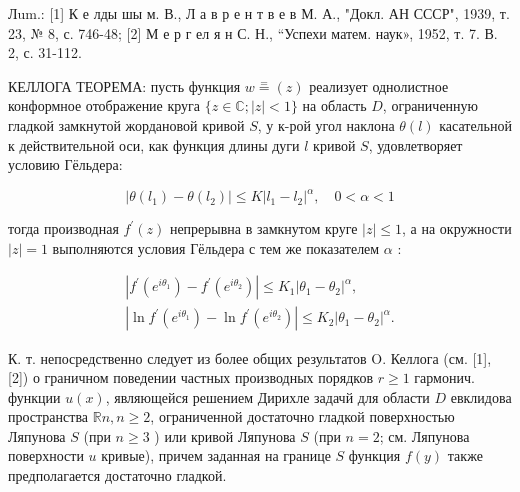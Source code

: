 \documentclass[10pt]{article}
\begin{document}
Лum.: [1] К е лды шы м. В., Л а в р е н т в е в М. А., "Докл. АН СССР", 1939, т. 23, № 8, с. 746-48; [2] М е р г ел я н С. Н., “Успехи матем. наук», 1952, т. 7. В. 2, с. 31-112.



КЕЛЛОГА ТЕОРЕМА: пусть функция $w \stackrel{=}{=}(z)$ реализует однолистное конформное отображение круга $\{z \in \mathbb{C} ;|z|<1\}$ на область $D$, ограниченную гладкой замкнутой жордановой кривой $S$, у к-рой угол наклона $\theta(l)$ касательной к действительной оси, как функция длины дуги $l$ кривой $S$, удовлетворяет условию Гёльдера:



\[

\left|\theta\left(l_{1}\right)-\theta\left(l_{2}\right)\right| \leqslant K\left|l_{1}-l_{2}\right|^{\alpha}, \quad 0<\alpha<1

\]



тогда производная $f^{\prime}(z)$ непрерывна в замкнутом круге $|z| \leqslant 1$, а на окружности $|z|=1$ выполняются условия Гёльдера с тем же показателем $\alpha$ :



\[

\begin{gathered}

\left|f^{\prime}\left(e^{i \theta_{1}}\right)-f^{\prime}\left(e^{i \theta_{2}}\right)\right| \leqslant K_{1}\left|\theta_{1}-\theta_{2}\right|^{\alpha}, \\

\left|\ln f^{\prime}\left(e^{i \theta_{1}}\right)-\ln f^{\prime}\left(e^{i \theta_{2}}\right)\right| \leqslant K_{2}\left|\theta_{1}-\theta_{2}\right|^{\alpha} .

\end{gathered}

\]



К. т. непосредственно следует из более общих результатов O. Келлога (см. [1], [2]) о граничном поведении частных производных порядков $r \geqslant 1$ гармонич. функции $u(x)$, являющейся решением Дирихле задачй для области $D$ евклидова пространства $\mathbb{R} n, n \geqslant 2$, ограниченной достаточно гладкой поверхностью Ляпунова $S$ (при $n \geqslant 3$ ) или кривой Ляпунова $S$ (при $n=2$; см. Ляпунова поверхности $u$ кривые), причем заданная на границе $S$ функция $f(y)$ также предполагается достаточно гладкой.
\end{document}
